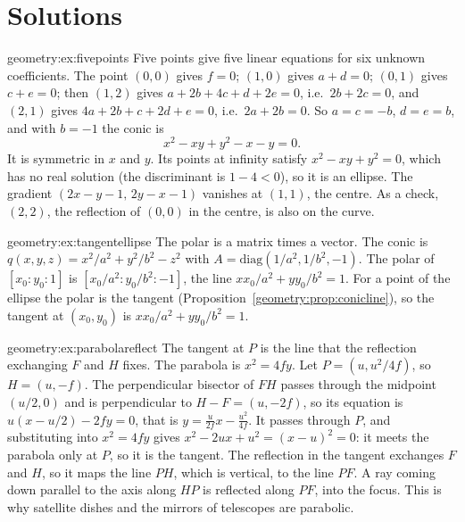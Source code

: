 \section{Solutions}

\begin{solution}{geometry:ex:fivepoints}
\idea Five points give five linear equations for six unknown coefficients.
\writeup The point $(0,0)$ gives $f=0$; $(1,0)$ gives $a+d=0$; $(0,1)$ gives $c+e=0$; then $(1,2)$ gives $a+2b+4c+d+2e=0$, i.e.\ $2b+2c=0$, and $(2,1)$
gives $4a+2b+c+2d+e=0$, i.e.\ $2a+2b=0$. So $a=c=-b$, $d=e=b$, and with $b=-1$ the conic is
\[
x^2-xy+y^2-x-y=0.
\]
It is symmetric in $x$ and $y$. Its points at infinity satisfy $x^2-xy+y^2=0$, which has no real solution (the discriminant is $1-4<0$), so it is an
ellipse. The gradient $(2x-y-1,\,2y-x-1)$ vanishes at $(1,1)$, the centre. As a check, $(2,2)$, the reflection of $(0,0)$ in the centre, is also on the curve.
\end{solution}

\begin{solution}{geometry:ex:tangentellipse}
\idea The polar is a matrix times a vector.
\writeup The conic is $q(x,y,z)=x^2/a^2+y^2/b^2-z^2$ with $A=\mathrm{diag}(1/a^2,1/b^2,-1)$. The polar of $[x_0:y_0:1]$ is $[x_0/a^2:y_0/b^2:-1]$, the line
$xx_0/a^2+yy_0/b^2=1$. For a point of the ellipse the polar is the tangent (Proposition~\ref{geometry:prop:conicline}), so the tangent at $(x_0,y_0)$ is
$xx_0/a^2+yy_0/b^2=1$.
\end{solution}

\begin{solution}{geometry:ex:parabolareflect}
\idea The tangent at $P$ is the line that the reflection exchanging $F$ and $H$ fixes.
\writeup The parabola is $x^2=4fy$. Let $P=(u,u^2/4f)$, so $H=(u,-f)$. The perpendicular bisector of $FH$ passes through the midpoint $(u/2,0)$ and is
perpendicular to $H-F=(u,-2f)$, so its equation is $u(x-u/2)-2fy=0$, that is $y=\frac{u}{2f}x-\frac{u^2}{4f}$. It passes through $P$, and
substituting into $x^2=4fy$ gives $x^2-2ux+u^2=(x-u)^2=0$: it meets the parabola only at $P$, so it is the tangent. The reflection in the tangent
exchanges $F$ and $H$, so it maps the line $PH$, which is vertical, to the line $PF$. A ray coming down parallel to the axis along $HP$ is reflected
along $PF$, into the focus. This is why satellite dishes and the mirrors of telescopes are parabolic.
\end{solution}

